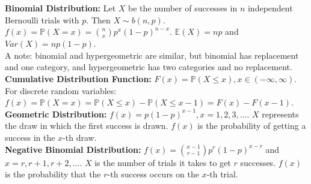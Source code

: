 \documentclass[10pt, twocolumn]{article}
\begin{document}
\textbf{Binomial Distribution:} Let $X$ be the number of successes in $n$ independent Bernoulli trials with $p$. Then $X \sim b(n,p)$. $f(x) = \mathbb{P}(X=x) = {n \choose x} p^x (1-p)^{n-x}$. $\mathbb{E}(X) = np$ and $Var(X) = np(1-p)$.\\
A note: binomial and hypergeometric are similar, but binomial has replacement and one category, and hypergeometric has two categories and no replacement.\\
\textbf{Cumulative Distribution Function:} $F(x) = \mathbb{P}(X \leq x), x \in (-\infty, \infty)$. For discrete random variables: $f(x) = \mathbb{P}(X=x) = \mathbb{P}(X \leq x) - \mathbb{P}(X \leq x - 1) = F(x) - F(x-1)$.\\
\textbf{Geometric Distribution:} $f(x) = p(1-p)^{x-1}, x = 1,2,3,\dots$. $X$ represents the draw in which the first success is drawn. $f(x)$ is the probability of getting a success in the $x$-th draw.\\
\textbf{Negative Binomial Distribution:} $f(x) = {x-1 \choose r-1} p^r (1-p)^{x-r}$ and $x = r,r+1,r+2,\dots$. $X$ is the number of trials it takes to get $r$ successes. $f(x)$ is the probability that the $r$-th success occurs on the $x$-th trial.
\end{document}
